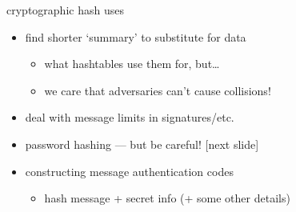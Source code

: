 

\begin{frame}{cryptographic hash uses}
    \begin{itemize}
    \item find shorter `summary' to substitute for data
        \begin{itemize}
        \item what hashtables use them for, but\ldots
        \item we care that adversaries can't cause collisions!
        \end{itemize}
    \vspace{.5cm}
    \item<2-> deal with message limits in signatures/etc.
    \item<2-> password hashing --- but be careful! [next slide]
    \item<2-> constructing message authentication codes
        \begin{itemize}
        \item hash message + secret info (+ some other details)
        \end{itemize}
    \end{itemize}
\end{frame}

